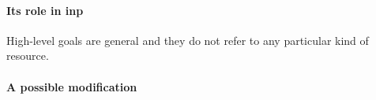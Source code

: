 
\paragraph{Its role in \texorpdfstring{\gls{inp}}{INP}}
High-level goals are general and they do not refer to any particular kind of resource.

\paragraph{A possible modification}